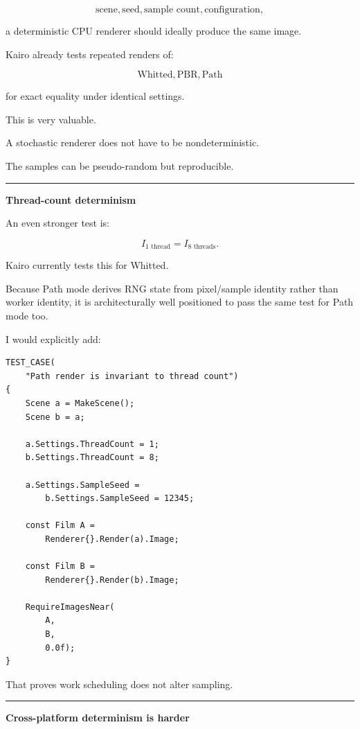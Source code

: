 \[
\text{scene},
\text{seed},
\text{sample count},
\text{configuration},
\]

a deterministic CPU renderer should ideally produce the same image.

Kairo already tests repeated renders of:

\[
\text{Whitted},
\text{PBR},
\text{Path}
\]

for exact equality under identical settings.

This is very valuable.

A stochastic renderer does not have to be nondeterministic.

The samples can be pseudo-random but reproducible.

\begin{center}\rule{0.5\linewidth}{0.5pt}\end{center}

\textbf{Thread-count determinism}

An even stronger test is:

\[
I_{\text{1 thread}}
=
I_{\text{8 threads}}.
\]

Kairo currently tests this for Whitted.

Because Path mode derives RNG state from pixel/sample identity rather than worker identity, it is architecturally well positioned to pass the same test for Path mode too.

I would explicitly add:

\begin{verbatim}
TEST_CASE(
    "Path render is invariant to thread count")
{
    Scene a = MakeScene();
    Scene b = a;

    a.Settings.ThreadCount = 1;
    b.Settings.ThreadCount = 8;

    a.Settings.SampleSeed =
        b.Settings.SampleSeed = 12345;

    const Film A =
        Renderer{}.Render(a).Image;

    const Film B =
        Renderer{}.Render(b).Image;

    RequireImagesNear(
        A,
        B,
        0.0f);
}
\end{verbatim}

That proves work scheduling does not alter sampling.

\begin{center}\rule{0.5\linewidth}{0.5pt}\end{center}

\textbf{Cross-platform determinism is harder}

